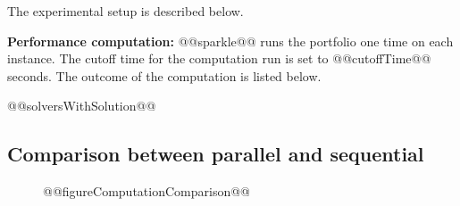 \documentclass[british]{article}
\begin{document}
The experimental setup is described below.

\textbf{Performance computation:} @@sparkle@@ runs the portfolio one time on each instance. The cutoff time for the computation run is set to @@cutoffTime@@ seconds. The outcome of the computation is listed below.

\begin{enumerate}
@@solversWithSolution@@
\end{enumerate}

\subsection{Comparison between parallel and sequential}
\label{sec:Comparison_parallel_sequential}

\begin{figure}[h]
    @@figureComputationComparison@@
\end{figure}



\end{document}
